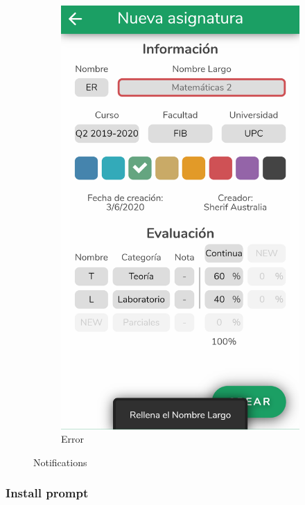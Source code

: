\begin{figure}[ht!]
\begin{subfigure}[b]{0.25\textwidth-0.1cm}
        \includegraphics[width=\textwidth]{media/screenshots/screenshot-notification-error.png}
        \caption{Error}
    \end{subfigure}
    \caption{Notifications}
    \label{fig:notifications}
\end{figure}
\vfill

\clearpage\newpage
\subsubsection{Install prompt}
\label{sec:install}

